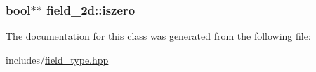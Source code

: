 \subsubsection[{\texorpdfstring{iszero}{iszero}}]{\setlength{\rightskip}{0pt plus 5cm}bool$\ast$$\ast$ field\+\_\+2d\+::iszero\hspace{0.3cm}{\ttfamily [protected]}}\hypertarget{classfield__2d_ad1d58a5f2c6f3eb2d1ef656db977baa5}{}\label{classfield__2d_ad1d58a5f2c6f3eb2d1ef656db977baa5}


The documentation for this class was generated from the following file\+:\begin{DoxyCompactItemize}
\item 
includes/\hyperlink{field__type_8hpp}{field\+\_\+type.\+hpp}\end{DoxyCompactItemize}
